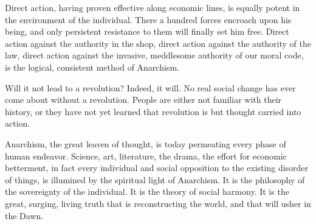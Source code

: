 Direct action, having proven effective along economic lines, is
equally potent in the environment of the individual. There a hundred
forces encroach upon his being, and only persistent resistance to them
will finally set him free. Direct action against the authority in the
shop, direct action against the authority of the law, direct action
against the invasive, meddlesome authority of our moral code, is the
logical, consistent method of Anarchism.

Will it not lead to a revolution? Indeed, it will. No real
social change has ever come about without a revolution. People are
either not familiar with their history, or they have not yet learned
that revolution is but thought carried into action.

Anarchism, the great leaven of thought, is today permeating every
phase of human endeavor. Science, art, literature, the drama, the
effort for economic betterment, in fact every individual and social
opposition to the existing disorder of things, is illumined by the
spiritual light of Anarchism. It is the philosophy of the sovereignty
of the individual. It is the theory of social harmony. It is the
great, surging, living truth that is reconstructing the world, and
that will usher in the Dawn.

